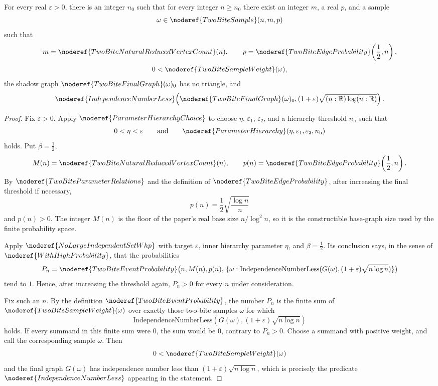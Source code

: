 \begin{lemma}
For every real \(\varepsilon>0\), there is an integer \(n_0\) such that for
every integer \(n\ge n_0\) there exist an integer \(m\), a real \(p\), and a
sample
\[
\omega\in\noderef{TwoBiteSample}(n,m,p)
\]
such that
\[
m=\noderef{TwoBiteNaturalReducedVertexCount}(n),\qquad
p=\noderef{TwoBiteEdgeProbability}\!\left(\frac12,n\right),
\]
\[
0<\noderef{TwoBiteSampleWeight}(\omega),
\]
the shadow graph \(\noderef{TwoBiteFinalGraph}(\omega)_0\) has no triangle,
and
\[
\noderef{IndependenceNumberLess}\!\left(
\noderef{TwoBiteFinalGraph}(\omega)_0,
(1+\varepsilon)\sqrt{(n:\mathbb R)\log(n:\mathbb R)}\right).
\]
\end{lemma}
\begin{proof}
Fix \(\varepsilon>0\).  Apply
\(\noderef{ParameterHierarchyChoice}\) to choose
\(\eta\), \(\varepsilon_1\), \(\varepsilon_2\), and a hierarchy threshold
\(n_{\mathrm h}\) such that
\[
0<\eta<\varepsilon
\qquad\text{and}\qquad
\noderef{ParameterHierarchy}(\eta,\varepsilon_1,\varepsilon_2,n_{\mathrm h})
\]
holds.  Put \(\beta=\frac12\),
\[
M(n)=\noderef{TwoBiteNaturalReducedVertexCount}(n),\qquad
p(n)=\noderef{TwoBiteEdgeProbability}\!\left(\frac12,n\right).
\]
By \(\noderef{TwoBiteParameterRelations}\) and the definition of
\(\noderef{TwoBiteEdgeProbability}\), after increasing the final threshold if
necessary,
\[
p(n)=\frac12\sqrt{\frac{\log n}{n}}
\]
and \(p(n)>0\).  The integer \(M(n)\) is the floor of the paper's real base size
\(n/\log^2 n\), so it is the constructible base-graph size used by the finite
probability space.

Apply \(\noderef{NoLargeIndependentSetWhp}\) with target \(\varepsilon\),
inner hierarchy parameter \(\eta\), and \(\beta=\frac12\).  Its conclusion says,
in the sense of \(\noderef{WithHighProbability}\), that the probabilities
\[
P_n=\noderef{TwoBiteEventProbability}\bigl(n,M(n),p(n),\,
\{\omega:\mathrm{IndependenceNumberLess}
(G(\omega),(1+\varepsilon)\sqrt{n\log n})\}\bigr)
\]
tend to \(1\).  Hence, after increasing the threshold again, \(P_n>0\) for every
\(n\) under consideration.

Fix such an \(n\).  By the definition
\(\noderef{TwoBiteEventProbability}\), the number \(P_n\) is the finite sum of
\(\noderef{TwoBiteSampleWeight}(\omega)\) over exactly those two-bite samples
\(\omega\) for which
\[
\mathrm{IndependenceNumberLess}
(G(\omega),(1+\varepsilon)\sqrt{n\log n})
\]
holds.  If every summand in this finite sum were \(0\), the sum would be \(0\),
contrary to \(P_n>0\).  Choose a summand with positive weight, and call the
corresponding sample \(\omega\).  Then
\[
0<\noderef{TwoBiteSampleWeight}(\omega)
\]
and the final graph \(G(\omega)\) has independence number less than
\((1+\varepsilon)\sqrt{n\log n}\), which is precisely the predicate
\(\noderef{IndependenceNumberLess}\) appearing in the statement.


\end{proof}
